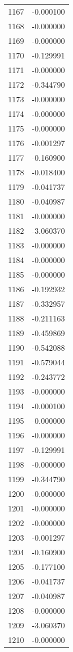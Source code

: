 \documentclass[12pt]{article}
\begin{document}
\begin{longtable}{@{}cc@{}}
1167 & -0.000100 \\
1168 & -0.000000 \\
1169 & -0.000000 \\
1170 & -0.129991 \\
1171 & -0.000000 \\
1172 & -0.344790 \\
1173 & -0.000000 \\
1174 & -0.000000 \\
1175 & -0.000000 \\
1176 & -0.001297 \\
1177 & -0.160900 \\
1178 & -0.018400 \\
1179 & -0.041737 \\
1180 & -0.040987 \\
1181 & -0.000000 \\
1182 & -3.060370 \\
1183 & -0.000000 \\
1184 & -0.000000 \\
1185 & -0.000000 \\
1186 & -0.192932 \\
1187 & -0.332957 \\
1188 & -0.211163 \\
1189 & -0.459869 \\
1190 & -0.542088 \\
1191 & -0.579044 \\
1192 & -0.243772 \\
1193 & -0.000000 \\
1194 & -0.000100 \\
1195 & -0.000000 \\
1196 & -0.000000 \\
1197 & -0.129991 \\
1198 & -0.000000 \\
1199 & -0.344790 \\
1200 & -0.000000 \\
1201 & -0.000000 \\
1202 & -0.000000 \\
1203 & -0.001297 \\
1204 & -0.160900 \\
1205 & -0.177100 \\
1206 & -0.041737 \\
1207 & -0.040987 \\
1208 & -0.000000 \\
1209 & -3.060370 \\
1210 & -0.000000 \\

\end{longtable}
\end{document}

